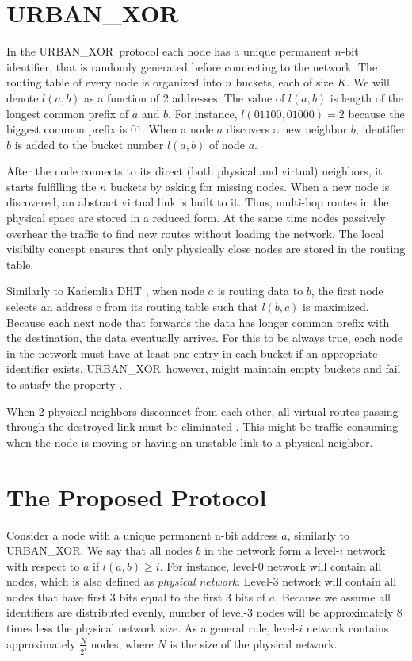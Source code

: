 \documentclass[14pt]{extarticle}
\theoremstyle{definition}
\newcommand{\urbanxor}{URBAN\_XOR}
\begin{document}
\section{\urbanxor}

In the \urbanxor\ protocol each node has a unique permanent $n$-bit identifier, that is randomly generated before connecting to the network. The routing table of every node is organized into $n$ buckets, each of size $K$. We will denote $l(a,b)$ as a function of 2 addresses. The value of $l(a,b)$ is length of the longest common prefix of $a$ and $b$. For instance, $l(01100, 01000) = 2$ because the biggest common prefix is $01$. When a node $a$ discovers a new neighbor $b$, identifier $b$ is added to the bucket number $l(a,b)$ of node $a$.

After the node connects to its direct (both physical and virtual) neighbors, it starts fulfilling the $n$ buckets by asking for missing nodes. When a new node is discovered, an abstract virtual link is built to it. Thus, multi-hop routes in the physical space are stored in a reduced form. At the same time nodes passively overhear the traffic to find new routes without loading the network. The local visibilty concept ensures that only physically close nodes are stored in the routing table.

Similarly to Kademlia DHT \cite{kademlia}, when node $a$ is routing data to $b$, the first node selects an address $c$ from its routing table such that $l(b,c)$ is maximized. Because each next node that forwards the data has longer common prefix with the destination, the data eventually arrives. For this to be always true, each node in the network must have at least one entry in each bucket if an appropriate identifier exists. \urbanxor\, however, might maintain empty buckets and fail to satisfy the property \cite{Pasquini}.

When 2 physical neighbors disconnect from each other, all virtual routes passing through the destroyed link must be eliminated \cite{Pasquini}. This might be traffic consuming when the node is moving or having an unstable link to a physical neighbor.


\section{The Proposed Protocol}

Consider a node with a unique permanent n-bit address $a$, similarly to \urbanxor. We say that all nodes $b$ in the network form a level-$i$ network with respect to $a$ if $l(a,b) \ge i$. For instance, level-0 network will contain all nodes, which is also defined as \emph{physical network}. Level-3 network will contain all nodes that have first 3 bits equal to the first 3 bits of $a$. Because we assume all identifiers are distributed evenly, number of level-3 nodes will be approximately 8 times less the physical network size. As a general rule, level-$i$ network contains approximately $\frac{N}{2^i}$ nodes, where $N$ is the size of the physical network.
\end{document}
